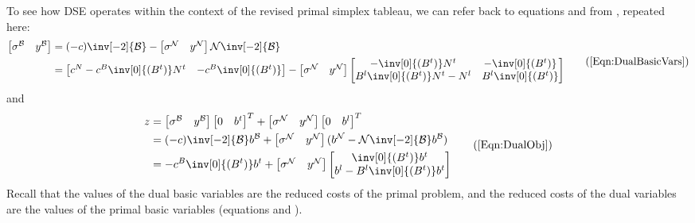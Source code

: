To see how DSE operates within the context of the revised primal simplex
tableau, we can refer back to equations  and
 from , repeated here:
\begin{equation}
\begin{split}
\begin{bmatrix} \sigma^\mathcal{B} & y^\mathcal{B} \end{bmatrix} & =
    (-c)\inv[-2]{\mathcal{B}} -
    \begin{bmatrix} \sigma^\mathcal{N} & y^\mathcal{N} \end{bmatrix}
    \mathcal{N}\inv[-2]{\mathcal{B}} \\
  & = \begin{bmatrix}
	c^N - c^B \inv[0]{(B^t)} N^t & -c^B \inv[0]{(B^t)}
      \end{bmatrix} -
      \begin{bmatrix} \sigma^\mathcal{N} & y^\mathcal{N} \end{bmatrix}
    \begin{bmatrix}
      -\inv[0]{(B^t)} N^t & -\inv[0]{(B^t)} \\
      B^l\inv[0]{(B^t)} N^t - N^l & B^l\inv[0]{(B^t)}
    \end{bmatrix}
\end{split} \tag{\ref{Eqn:DualBasicVars}}
\end{equation}
and
\begin{equation}
\begin{split}
z & = \begin{bmatrix} \sigma^\mathcal{B} & y^\mathcal{B} \end{bmatrix}
      \begin{bmatrix} 0 & b^t \end{bmatrix}^T +
      \begin{bmatrix} \sigma^\mathcal{N} & y^\mathcal{N} \end{bmatrix}
      \begin{bmatrix} 0 & b^l \end{bmatrix}^T \\
  & = (-c)\inv[-2]{\mathcal{B}} b^\mathcal{B} +
      \begin{bmatrix} \sigma^\mathcal{N} & y^\mathcal{N} \end{bmatrix}
      (b^\mathcal{N} - \mathcal{N}\inv[-2]{\mathcal{B}} b^\mathcal{B}) \\
  & = -c^B \inv[0]{(B^t)} b^t +
      \begin{bmatrix} \sigma^\mathcal{N} & y^\mathcal{N} \end{bmatrix}
      \begin{bmatrix}
	 \inv[0]{(B^t)} b^t \\ b^l - B^l\inv[0]{(B^t)} b^t
      \end{bmatrix}
\end{split} \tag{\ref{Eqn:DualObj}}
\end{equation}
Recall that the values of the dual basic variables are the reduced costs of
the primal problem, and the reduced costs of the dual variables are the values
of the primal basic variables (\cf equations  and
).

